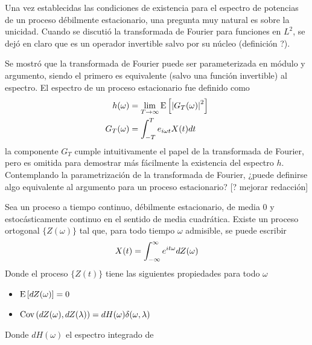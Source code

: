 
Una vez establecidas las condiciones de existencia para el espectro de potencias de un proceso débilmente estacionario, una pregunta muy natural es sobre la unicidad.
%
Cuando se discutió la transformada de Fourier para funciones en $L^{2}$, se dejó en claro que es un operador invertible salvo por su núcleo (definición ?).

Se mostró que la transformada de Fourier puede ser parameterizada en módulo y argumento, siendo el primero es equivalente (salvo una función invertible) al espectro.
%
El espectro de un proceso estacionario fue definido como
\begin{align*}
h(\omega) &= \lim_{T\rightarrow\infty} \mathrm{E}\left[ \left|  G_T(\omega) \right|^{2} \right] \\
G_T(\omega) &= \int_{-T}^{T} e_{i \omega t} X(t) dt
\end{align*}
la componente $G_T$ cumple intuitivamente el papel de la transformada de Fourier, pero es omitida para demostrar más fácilmente la existencia del espectro $h$. Contemplando la parametrización de la transformada de Fourier, ¿puede definirse algo equivalente al argumento para un proceso estacionario?
%
[? mejorar redacción]

\begin{teorema}
Sea \xt un proceso a tiempo continuo, débilmente estacionario, de media 0 y estocásticamente continuo en el sentido de media cuadrática. Existe un proceso ortogonal $\{Z(\omega)\}$ tal que, para todo tiempo $\omega$ admisible, se puede escribir
\begin{equation*}
X(t) = \int_{-\infty}^{\infty} e^{i t \omega} dZ(\omega)
\end{equation*}
Donde el proceso $\{Z(t)\}$ tiene las siguientes propiedades para todo $\omega$
\begin{itemize}
\item $\mathrm{E}\left[ dZ(\omega) \right] = 0$
\item $\mathrm{Cov}\left( dZ(\omega),dZ(\lambda) \right) = dH(\omega) \delta(\omega, \lambda)$
\end{itemize}
Donde $dH(\omega)$ el espectro integrado de \xt
\label{rep_espectral}
\end{teorema}

